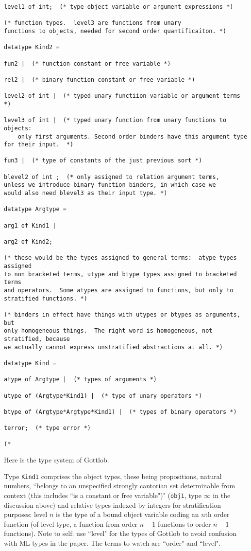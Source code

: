 \documentclass{article}
\begin{document}
{{\begin{verbatim}
level1 of int;  (* type object variable or argument expressions *)

(* function types.  level3 are functions from unary
functions to objects, needed for second order quantificaiton. *)

datatype Kind2 =

fun2 |  (* function constant or free variable *)

rel2 |  (* binary function constant or free variable *)

level2 of int |  (* typed unary functiion variable or argument terms *)

level3 of int |  (* typed unary function from unary functions to objects:  
    only first arguments. Second order binders have this argument type
for their input.  *)

fun3 |  (* type of constants of the just previous sort *)

blevel2 of int ;  (* only assigned to relation argument terms,
unless we introduce binary function binders, in which case we
would also need blevel3 as their input type. *)

datatype Argtype =

arg1 of Kind1 |

arg2 of Kind2;

(* these would be the types assigned to general terms:  atype types assigned
to non bracketed terms, utype and btype types assigned to bracketed terms
and operators.  Some atypes are assigned to functions, but only to stratified functions. *)

(* binders in effect have things with utypes or btypes as arguments, but
only homogeneous things.  The right word is homogeneous, not stratified, because
we actually cannot express unstratified abstractions at all. *)

datatype Kind =

atype of Argtype |  (* types of arguments *)

utype of (Argtype*Kind1) |  (* type of unary operators *)

btype of (Argtype*Argtype*Kind1) |  (* types of binary operators *)

terror;  (* type error *)

(*
\end{verbatim}

Here is the type system of Gottlob.  

 Type {\tt Kind1} comprises the object types, these being propositions, natural numbers, ``belongs to an unspecified strongly cantorian set determinable from context (this includes ``is a constant or free variable")" ({\tt obj1}, type $\infty$ in the discussion above) and relative types indexed by
integers for stratification purposes:  level $n$ is the type of a bound object variable coding an $n$th order function (of level type, a function from order $n-1$ functions to order $n-1$ functions).  Note to self:  use ``level" for the types of Gottlob to avoid confusion with ML types in the paper.  The terms to watch are ``order" and ``level".

}}
\end{document}
